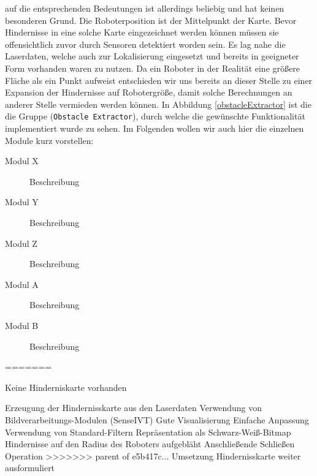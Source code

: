 auf die entsprechenden Bedeutungen ist allerdings beliebig und hat keinen besonderen Grund.
 Die Roboterposition ist der Mittelpunkt der Karte. Bevor Hindernisse in eine solche Karte eingezeichnet werden
 können müssen sie offensichtlich zuvor durch Sensoren detektiert worden sein. Es lag nahe die Laserdaten,
 welche auch zur Lokalisierung eingesetzt und bereits in geeigneter Form vorhanden waren zu nutzen.
 Da ein Roboter in der Realität eine größere Fläche als ein Punkt aufweist entschieden wir uns bereits an dieser
 Stelle zu einer Expansion der Hindernisse auf Robotergröße, damit solche Berechnungen an anderer Stelle vermieden
 werden können.
 In Abbildung \ref{obstacleExtractor} ist die die Gruppe (\lstinline{Obstacle Extractor}),
 durch welche die gewünschte Funktionalität implementiert wurde zu sehen.
 Im Folgenden wollen wir auch hier die einzelnen Module kurz vorstellen:


\begin{description}
\item[Modul X] Beschreibung
\item[Modul Y] Beschreibung
\item[Modul Z] Beschreibung
\item[Modul A] Beschreibung
\item[Modul B] Beschreibung
\end{description}



=======
 
 Keine Hinderniskarte vorhanden

Erzeugung der Hindernisskarte aus den Laserdaten
Verwendung von Bildverarbeitungs-Modulen (SenseIVT)
            Gute Visualisierung
            Einfache Anpassung
            Verwendung von Standard-Filtern
         Repräsentation als Schwarz-Weiß-Bitmap
        Hindernisse auf den Radius des Roboters aufgebläht
        Anschließende Schließen Operation
>>>>>>> parent of e5b417c... Umsetzung Hindernisskarte weiter ausformuliert
